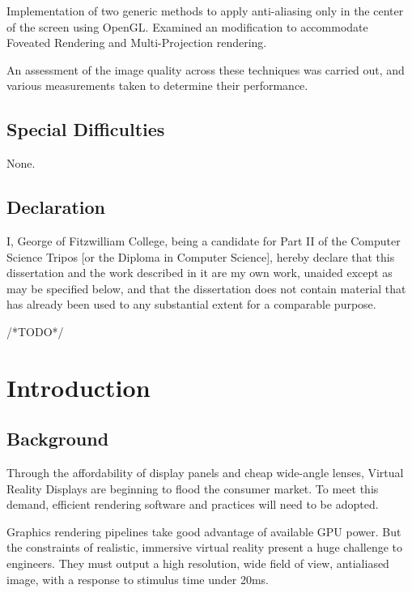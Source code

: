 \documentclass[12pt,a4paper,twoside,openright]{report}
\begin{document}
Implementation of two generic methods to apply anti-aliasing only in the center of the screen using OpenGL. Examined an modification to accommodate Foveated Rendering and Multi-Projection rendering.

An assessment of the image quality across these techniques was carried out, and various measurements taken to determine their performance.   

\section*{Special Difficulties}

None.
 
\newpage
\section*{Declaration}

I, George of Fitzwilliam College, being a candidate for Part II of the Computer
Science Tripos [or the Diploma in Computer Science], hereby declare
that this dissertation and the work described in it are my own work,
unaided except as may be specified below, and that the dissertation
does not contain material that has already been used to any substantial
extent for a comparable purpose.

\bigskip
{}

\medskip
{} /*TODO*/

\tableofcontents

\listoffigures


\pagestyle{headings}

\chapter{Introduction}

\section{Background}

Through the affordability of display panels and cheap wide-angle lenses, Virtual Reality Displays are beginning to flood the consumer market. To meet this demand, efficient rendering software and practices will need to be adopted.

Graphics rendering pipelines take good advantage of available GPU power. But the constraints of realistic, immersive virtual reality present a huge challenge to engineers. They must output a high resolution, wide field of view, antialiased image, with a response to stimulus time under 20ms.
\end{document}
